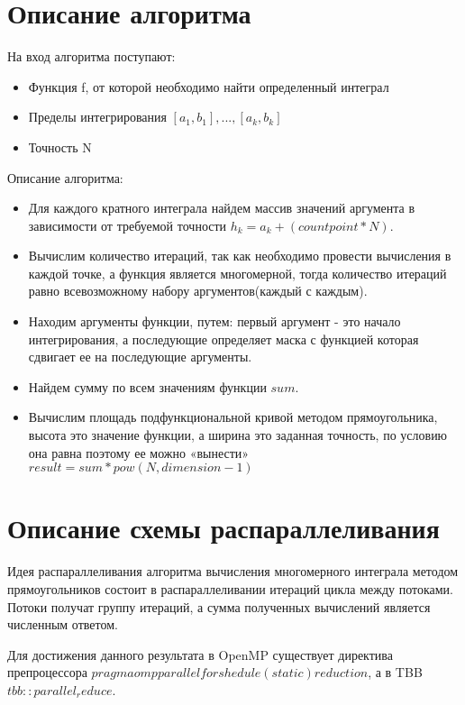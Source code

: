\documentclass{report}
\begin{document}
 \section*{Описание алгоритма}
 На вход алгоритма поступают:
 \begin{itemize}
 \item Функция f, от которой необходимо найти определенный интеграл
 \item Пределы интегрирования $[a_1,b_1],...,[a_k, b_k]$
 \item Точность N
 \end{itemize}
 \par Описание алгоритма:
 \begin{itemize}
 \item Для каждого кратного интеграла найдем массив значений аргумента в зависимости от требуемой точности $h_k=a_k+(countpoint*N)$.
 \item Вычислим количество итераций, так как необходимо провести вычисления в каждой точке, а функция является многомерной, тогда количество итераций равно всевозможному набору аргументов(каждый с каждым).
 \item Находим аргументы функции, путем: первый аргумент - это начало интегрирования, а последующие определяет маска с функцией которая сдвигает ее на последующие аргументы.
 \item Найдем сумму по всем значениям функции $sum$.
 \item Вычислим площадь подфункциональной кривой методом прямоугольника, высота это значение функции, а ширина это заданная точность, по условию она равна поэтому ее можно «вынести» $result=sum*pow(N,dimension-1)$

 \end{itemize}

 \newpage

 \section*{Описание схемы распараллеливания}

 Идея распараллеливания алгоритма вычисления многомерного интеграла методом прямоугольников состоит в распараллеливании итераций цикла между потоками. Потоки получат группу итераций, а сумма полученных вычислений является численным ответом.
\par Для достижения данного результата в OpenMP существует директива препроцессора $pragma omp parallel for shedule(static) reduction$, а в TBB $tbb::parallel_reduce$.
\end{document}

